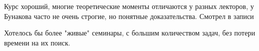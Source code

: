         \begin{commentbox}
            Курс хороший, многие теоретические моменты отличаются у разных лекторов, у Бунакова часто не очень строгие, но понятные доказательства. Смотрел в записи
        \end{commentbox}

        \begin{commentbox}
            Хотелось бы более "живые" семинары, с большим количеством задач, без потери времени на их поиск.
        \end{commentbox}